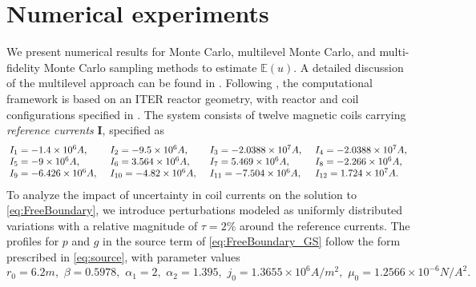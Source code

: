 \section{Numerical experiments}\label{sec:Num-Exp}
%
We present numerical results for Monte Carlo, multilevel Monte Carlo, and multi-fidelity Monte Carlo sampling methods to estimate $\mathbb{E}(u)$. A detailed discussion of the multilevel approach can be found in \cite{ElLiSa:2023,Gi:2008,Gi:2015}. Following \cite{FaHe:2017}, the computational framework is based on an ITER reactor geometry, with reactor and coil configurations specified in \cite{Amoskov:2009}. The system consists of twelve magnetic coils carrying \textit{reference currents} $\boldsymbol{I}$, specified as
%
\begin{equation}\label{eq:CentralCurrentValue}
{\renewcommand{\arraycolsep}{2pt}
\begin{array}{llll}
I_1 = -1.4 \times 10^{6} A, \quad & I_2 = -9.5 \times 10^{6} A, \quad & I_3 = -2.0388 \times 10^{7} A, \quad & I_4 = -2.0388 \times 10^{7} A, \\
I_5 = -9 \times 10^{6} A, \quad & I_6 = 3.564 \times 10^{6} A, \quad & I_7 = 5.469 \times 10^{6} A, \quad & I_8 = -2.266 \times 10^{6} A, \\
I_9 = -6.426 \times 10^{6} A, \quad & I_{10} = -4.82 \times 10^{6} A, \quad & I_{11} = -7.504 \times 10^{6} A, \quad & I_{12} = 1.724 \times 10^{7} A. 
\end{array}
}
\end{equation}
%
To analyze the impact of uncertainty in coil currents on the solution to \eqref{eq:FreeBoundary}, we introduce perturbations modeled as uniformly distributed variations with a relative magnitude of $\tau = 2\%$ around the reference currents. The profiles for $p$ and $g$ in the source term of \eqref{eq:FreeBoundary_GS} follow the form prescribed in \eqref{eq:source}, with parameter values
%
\begin{equation}\label{eq:CentralParameterValue}
r_0=6.2m,\,\,\beta=0.5978, \,\, \alpha_1 = 2, \,\,  \alpha_2=1.395, \,\, j_0=1.3655 \times 10^6 A/m^2,\,\,  \mu_0=1.2566\times 10^{-6} N/A^2.
\end{equation}
%
